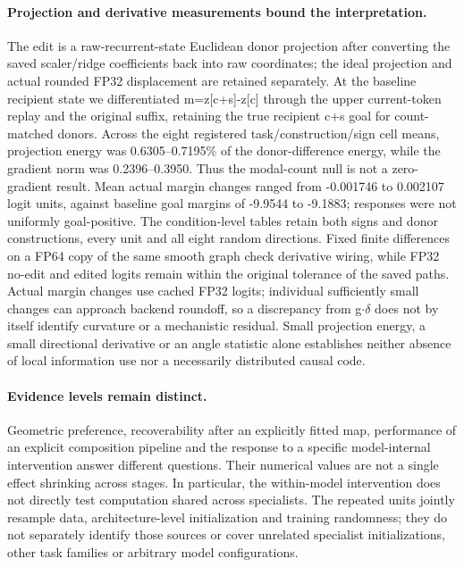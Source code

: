 \paragraph{Projection and derivative measurements bound the interpretation.} The edit is a raw-recurrent-state Euclidean donor projection after converting the saved scaler/ridge coefficients back into raw coordinates; the ideal projection and actual rounded FP32 displacement are retained separately. At the baseline recipient state we differentiated m=z[c+s]-z[c] through the upper current-token replay and the original suffix, retaining the true recipient c+s goal for count-matched donors. Across the eight registered task/construction/sign cell means, projection energy was 0.6305--0.7195\% of the donor-difference energy, while the gradient norm was 0.2396--0.3950. Thus the modal-count null is not a zero-gradient result. Mean actual margin changes ranged from -0.001746 to 0.002107 logit units, against baseline goal margins of -9.9544 to -9.1883; responses were not uniformly goal-positive. The condition-level tables retain both signs and donor constructions, every unit and all eight random directions. Fixed finite differences on a FP64 copy of the same smooth graph check derivative wiring, while FP32 no-edit and edited logits remain within the original tolerance of the saved paths. Actual margin changes use cached FP32 logits; individual sufficiently small changes can approach backend roundoff, so a discrepancy from g$\cdot$$\delta$ does not by itself identify curvature or a mechanistic residual. Small projection energy, a small directional derivative or an angle statistic alone establishes neither absence of local information use nor a necessarily distributed causal code.

\paragraph{Evidence levels remain distinct.} Geometric preference, recoverability after an explicitly fitted map, performance of an explicit composition pipeline and the response to a specific model-internal intervention answer different questions. Their numerical values are not a single effect shrinking across stages. In particular, the within-model intervention does not directly test computation shared across specialists. The repeated units jointly resample data, architecture-level initialization and training randomness; they do not separately identify those sources or cover unrelated specialist initializations, other task families or arbitrary model configurations.



